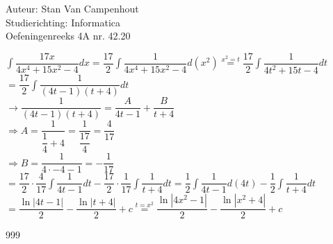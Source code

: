 \documentclass[a4paper]{article}
\begin{document}
  
\noindent \large Auteur: Stan Van Campenhout \\
\noindent \large Studierichting:  Informatica\\
\noindent \large Oefeningenreeks 4A nr. 42.20\\

\medskip

\normalsize

$ \displaystyle\int\dfrac{17x}{4x^4 +15x^2 -4}dx = \dfrac{17}{2}\displaystyle\int\dfrac{1}{4x^4 +15x^2 -4}d\left(x^2\right) 
\stackrel{x^2 = t}{=} \dfrac{17}{2}\displaystyle\int\dfrac{1}{4t^2 +15t -4}dt $\\

$ = \dfrac{17}{2}\displaystyle\int\dfrac{1}{\left(4t - 1\right)\left(t+4\right)}dt $\\

$ \rightarrow \dfrac{1}{\left(4t - 1\right)\left(t+4\right)} = \dfrac{A}{4t-1}+\dfrac{B}{t+4} $\\

$ \Rightarrow A = \dfrac{1}{\dfrac{1}{4}+4} = \dfrac{1}{\dfrac{17}{4}} = \dfrac{4}{17} $\\

$ \Rightarrow B = \dfrac{1}{4\cdot-4-1} = -\dfrac{1}{17} $\\

$ = \dfrac{17}{2}\cdot\dfrac{4}{17}\displaystyle\int\dfrac{1}{4t-1}dt - \dfrac{17}{2}\cdot\dfrac{1}{17}\displaystyle\int\dfrac{1}{t+4}dt 
= \dfrac{1}{2}\displaystyle\int\dfrac{1}{4t-1}d\left(4t\right)-\dfrac{1}{2}\displaystyle\int\dfrac{1}{t+4}dt $\\

$ = \dfrac{\ln|4t-1|}{2} - \dfrac{\ln|t+4|}{2}+c \stackrel{t = x^2}{=} \dfrac{\ln|4x^2-1|}{2} - \dfrac{\ln|x^2+4|}{2}+c $\\

\begin{thebibliography}{999}
\end{thebibliography}
\end{document}
